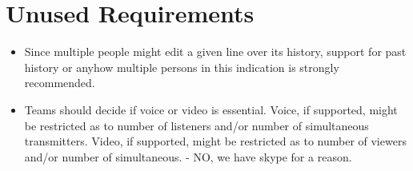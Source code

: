 \documentclass[11pt]{report}
\begin{document}
\section{Unused Requirements}
    \begin{itemize}
        \item Since multiple people might edit a given line over its history, support for past history or anyhow multiple persons in this indication is strongly recommended.
        \item Teams should decide if voice or video is essential. Voice, if supported, might be restricted as to number of listeners and/or number of simultaneous transmitters. Video, if supported, might be restricted as to number of viewers and/or number of simultaneous. - NO, we have skype for a reason.
    \end{itemize}
    
\end{document}
